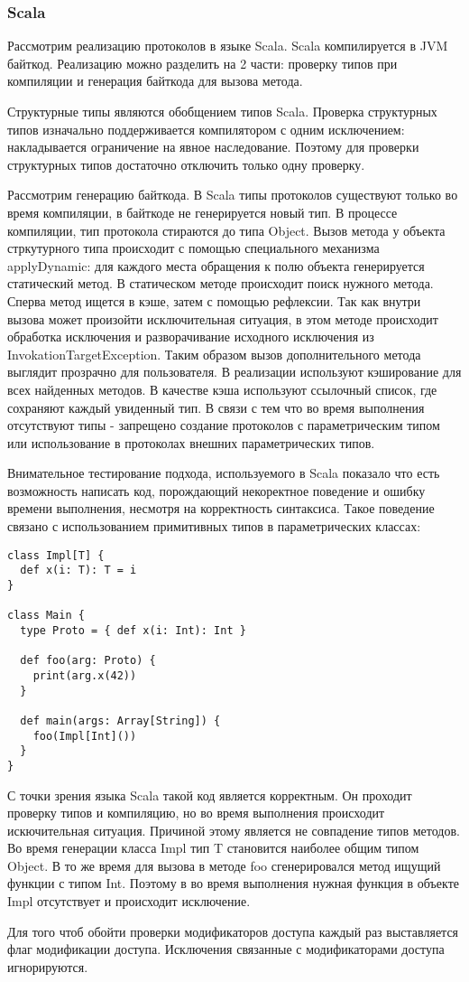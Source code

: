 \subsubsection{Scala}
Рассмотрим реализацию протоколов в языке Scala\cite{scala:structural}. Scala компилируется в JVM байткод. Реализацию можно разделить на 2 части: проверку типов при компиляции и генерация байткода для вызова метода.

Структурные типы являются обобщением типов Scala. Проверка структурных типов изначально поддерживается компилятором с одним исключением: накладывается ограничение на явное наследование. Поэтому для проверки структурных типов достаточно отключить только одну проверку.

Рассмотрим генерацию байткода. В Scala типы протоколов существуют только во время компиляции, в байткоде не генерируется новый тип. В процессе компиляции, тип протокола стираются до типа Object. Вызов метода у объекта стркутурного типа происходит с помощью специального механизма applyDynamic: для каждого места обращения к полю объекта генерируется статический метод. В статическом методе происходит поиск нужного метода. Сперва метод ищется в кэше, затем с помощью рефлексии. Так как внутри вызова может произойти исключительная ситуация, в этом методе происходит обработка исключения и разворачивание исходного исключения из InvokationTargetException. Таким образом вызов дополнительного метода выглядит прозрачно для пользователя. В реализации используют кэширование для всех найденных методов. В качестве кэша используют ссылочный список, где сохраняют каждый увиденный тип. В связи с тем что во время выполнения отсутствуют типы - запрещено создание протоколов с параметрическим типом или использование в протоколах внешних параметрических типов.

Внимательное тестирование подхода, используемого в Scala показало что есть возможность написать код, порождающий некоректное поведение и ошибку времени выполнения, несмотря на корректность синтаксиса. Такое поведение связано с использованием примитивных типов в параметрических классах:

\begin{verbatim}
class Impl[T] {
  def x(i: T): T = i
}

class Main {
  type Proto = { def x(i: Int): Int }

  def foo(arg: Proto) {
    print(arg.x(42))
  }

  def main(args: Array[String]) {
    foo(Impl[Int]())
  }
}
\end{verbatim}

С точки зрения языка Scala такой код является корректным. Он проходит проверку типов и компиляцию, но во время выполнения происходит искючительная ситуация. Причиной этому является не совпадение типов методов. Во время генерации класса Impl тип T становится наиболее общим типом Object. В то же время для вызова в методе foo сгенерировался метод ищущий функции с типом Int. Поэтому в во время выполнения нужная функция в объекте Impl отсутствует и происходит исключение.

Для того чтоб обойти проверки модификаторов доступа каждый раз выставляется флаг модификации доступа. Исключения связанные с модификаторами доступа игнорируются.
